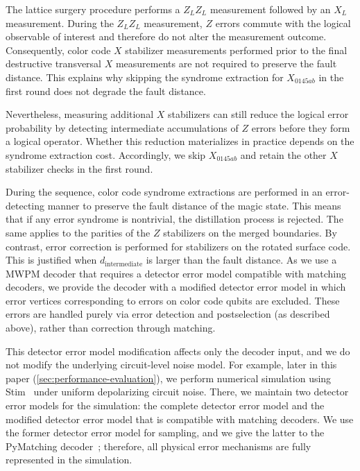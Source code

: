 The lattice surgery procedure performs a $Z_LZ_L$ measurement followed by an $X_L$ measurement.
During the $Z_LZ_L$ measurement, $Z$ errors commute with the logical observable of interest and therefore do not alter the measurement outcome.
Consequently, color code $X$ stabilizer measurements performed prior to the final destructive transversal $X$ measurements are not required to preserve the fault distance.
This explains why skipping the syndrome extraction for $X_{0145ab}$ in the first round does not degrade the fault distance.

Nevertheless, measuring additional $X$ stabilizers can still reduce the logical error probability by detecting intermediate accumulations of $Z$ errors before they form a logical operator.
Whether this reduction materializes in practice depends on the syndrome extraction cost.
Accordingly, we skip $X_{0145ab}$ and retain the other $X$ stabilizer checks in the first round.

During the sequence, color code syndrome extractions are performed in an error-detecting manner to preserve the fault distance of the magic state.
This means that if any error syndrome is nontrivial, the distillation process is rejected.
The same applies to the parities of the $Z$ stabilizers on the merged boundaries.
By contrast, error correction is performed for stabilizers on the rotated surface code.
This is justified when $d_{\mathrm{intermediate}}$ is larger than the fault distance.
As we use a MWPM decoder that requires a detector error model compatible with matching decoders, we provide the decoder with a modified detector error model in which error vertices corresponding to errors on color code qubits are excluded.
These errors are handled purely via error detection and postselection (as described above), rather than correction through matching.

This detector error model modification affects only the decoder input, and we do not modify the underlying circuit-level noise model.
For example, later in this paper (\autoref{sec:performance-evaluation}), we perform numerical simulation using Stim~\cite{gidney2021stim} under uniform depolarizing circuit noise.
There, we maintain two detector error models for the simulation: the complete detector error model and the modified detector error model that is compatible with matching decoders.
We use the former detector error model for sampling, and we give the latter to the PyMatching decoder~\cite{higgott2025sparse}; therefore, all physical error mechanisms are fully represented in the simulation.

